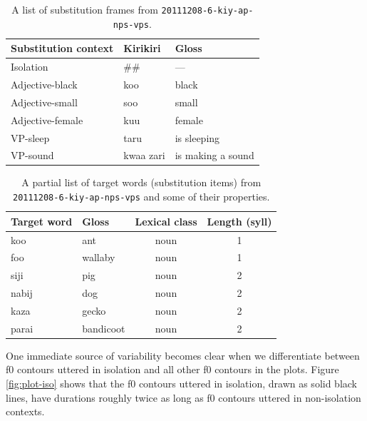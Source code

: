 \documentclass[12pt]{article}
\begin{document}
\begin{table}
    \begin{tabular}{l|ll}
      Substitution context            & Kirikiri                     & Gloss                                \\\hline
    Isolation        & \#\underline{\qquad}\#       & ---                                  \\
    Adjective-black  & \underline{\qquad} koo       & black \underline{\qquad}             \\
    Adjective-small  & \underline{\qquad} soo       & small \underline{\qquad}             \\
    Adjective-female & \underline{\qquad} kuu       & female \underline{\qquad}            \\
    VP-sleep         & \underline{\qquad} taru      & \underline{\qquad} is sleeping       \\
    VP-sound         & \underline{\qquad} kwaa zari & \underline{\qquad} is making a sound \\
    \end{tabular}
\label{tab:kiy-20111208-frame}
\caption{A list of substitution frames from \texttt{20111208-6-kiy-ap-nps-vps}.}
\end{table}

\begin{table}
    \begin{tabular}{l|lcc}
    Target word & Gloss     & Lexical class & Length (syll) \\\hline
    koo               & ant       & noun          & 1                  \\
    foo               & wallaby   & noun          & 1                  \\
    siji              & pig       & noun          & 2                  \\
    nabij             & dog       & noun          & 2                  \\
    kaza              & gecko     & noun          & 2                  \\
    parai             & bandicoot & noun          & 2                  \\
    \end{tabular}
\label{tab:kiy-20111208-target}
\caption{A partial list of target words (substitution items) from
  \texttt{20111208-6-kiy-ap-nps-vps} and some of their properties.}
\end{table}

One immediate source of variability becomes clear when we
differentiate between f0 contours uttered in isolation and all other
f0 contours in the plots. Figure \ref{fig:plot-iso} shows that the f0 contours
uttered in isolation, drawn as solid black lines, have durations
roughly twice as long as f0 contours uttered in non-isolation
contexts. 
\end{document}
